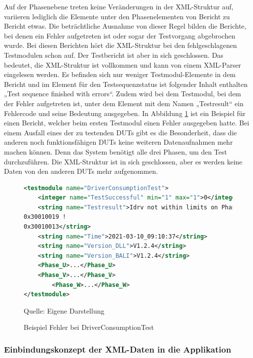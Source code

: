 Auf der Phasenebene treten keine Veränderungen in der \ac{XML}-Struktur auf, variieren lediglich die Elemente unter den
Phasenelementen von Bericht zu Bericht etwas.
Die beträchtliche Ausnahme von dieser Regel bilden die Berichte, bei denen ein Fehler aufgetreten ist oder sogar der
Testvorgang abgebrochen wurde. Bei diesen Berichten hört die \ac{XML}-Struktur bei den fehlgeschlagenen Testmodulen schon auf.
Der Testbericht ist aber in sich geschlossen. Das bedeutet, die \ac{XML}-Struktur ist vollkommen und kann von einem \ac{XML}-Parser eingelesen werden.
Es befinden sich nur weniger Testmodul-Elemente in dem Bericht und im Element für den Testsequenzstatus ist folgender Inhalt
enthalten „Test sequence finished with errors“. Zudem wird bei dem Testmodul, bei dem der Fehler aufgetreten ist, unter
dem Element mit dem Namen „Testresult“ ein Fehlercode und seine Bedeutung ausgegeben. In Abbildung \ref{fig: Beispiel Fehler bei DriverConsumptionTest} ist ein
Beispiel für einen Bericht, welcher beim ersten Testmodul einen Fehler ausgegeben hatte.
Bei einem Ausfall eines der zu testenden \ac{DUTs} gibt es die Besonderheit, dass die anderen noch funktionsfähigen \ac{DUTs}
keine weiteren Datenaufnahmen mehr machen können. Denn das System benötigt alle drei Phasen, um den Test durchzuführen.
Die \ac{XML}-Struktur ist in sich geschlossen, aber es werden keine Daten von den anderen \ac{DUTs} mehr aufgenommen.

\begin{figure}[H]
\centering
\begin{minipage}{0.95\textwidth}
\begin{lstlisting}[language=XML]
<testmodule name="DriverConsumptionTest">
	<integer name="TestSuccessful" min="1" max="1">0</integer>
	<string name="Testresult">Idrv not within limits on Phase U
0x30010019 !
0x30010013</string>
	<string name="Time">2021-03-10_09:10:37</string>
	<string name="Version_DLL">V1.2.4</string>
    <string name="Version_BALI">V1.2.4</string>
    <Phase_U>...</Phase_U>
    <Phase_V>...</Phase_V>
        <Phase_W>...</Phase_W>
</testmodule>
\end{lstlisting}
\end{minipage}
\caption{Beispiel Fehler bei DriverConsumptionTest}
\label{fig: Beispiel Fehler bei DriverConsumptionTest}
    {Quelle: Eigene Darstellung}
\end{figure}

\subsubsection{Einbindungskonzept der XML-Daten in die Applikation}

